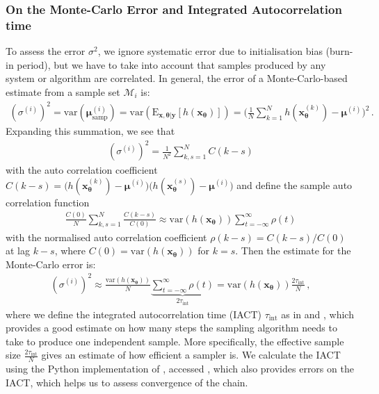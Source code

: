 \subsubsection{On the Monte-Carlo Error and Integrated Autocorrelation time}
To assess the error $\sigma^2$, we ignore systematic error due to initialisation bias (burn-in period), but we have to take into account that samples produced by any system or algorithm are correlated.
In general, the error of a Monte-Carlo-based estimate from a sample set $\mathcal{M}_i$ is:
\begin{align}
	(\sigma^{(i)})^2 = \text{var}(\bm{\mu}^{(i)}_{\text{samp}} ) =  \text{var}(\text{E}_{\bm{x},\bm{\theta}|\bm{y}} [h(\bm{x}_{\bm{\theta}})]) = \Bigg( \frac{1}{N} \sum_{k=1}^{N} h(\bm{x}^{(k)}_{\bm{\theta}}) - \bm{\mu}^{(i)} \Bigg)^2 \, .
\end{align}
Expanding this summation, we see that
\begin{align}
	(\sigma^{(i)})^2	= \frac{1}{N^2} \sum_{k,s=1}^{N} C(k-s)
\end{align}
with the auto correlation coefficient $C(k-s) =  \big( h(\bm{x}^{(k)}_{\bm{\theta}}) - \bm{\mu}^{(i)} \big) \big(h(\bm{x}^{(s)}_{\bm{\theta}}) - \bm{\mu}^{(i)} \big)$ and define the sample auto correlation function
\begin{align}
	\frac{C(0)}{N} \sum_{k,s=1}^{N} \frac{C(k-s)}{C(0)} \approx \text{var}(h(\bm{x}_{\bm{\theta}}) ) \sum_{t = - \infty }^{\infty} \rho(t)
\end{align}
with the normalised auto correlation coefficient $\rho(k-s) =  C(k-s)/ C(0)$ at lag $k-s$, where $C(0) = \text{var}(h(\bm{x}_{\bm{\theta}}) )$ for $k = s$.
Then the estimate for the Monte-Carlo error is:
\begin{align}
	(\sigma^{(i)})^2   \approx  \frac{\text{var}(h(\bm{x}_{\bm{\theta}}) )}{N} \underbrace{\sum_{t = - \infty }^{\infty} \rho(t)}_{	2\tau_{\text{int}} } = \text{var}(h(\bm{x}_{\bm{\theta}})) \frac{ 2 \tau_{\text{int}} }{N} \, , \label{eq:MCerr}
\end{align}
where we define the integrated autocorrelation time (IACT) $\tau_{\text{int}}$ as in \cite{Sokal1997} and \cite{}, which provides a good estimate on how many steps the sampling algorithm needs to take to produce one independent sample.
More specifically, the effective sample size $\frac{ 2 \tau_{\text{int}} }{N}$ gives an estimate of how efficient a sampler is.
We calculate the IACT using the Python implementation of \cite{WOLFF2004143}, accessed \cite{wolff2004monte}, which also provides errors on the IACT, which helps us to assess convergence of the chain.

